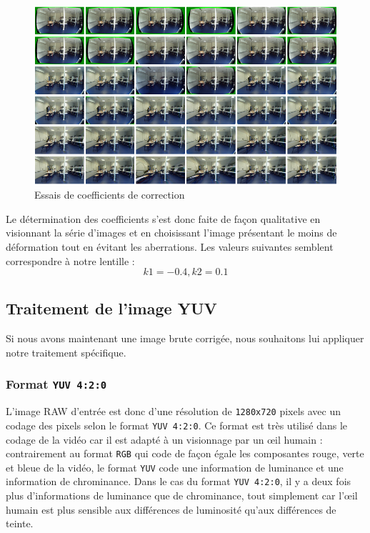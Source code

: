 \documentclass[11pt,a4paper]{article}
\begin{document}
\bigbreak
\bigbreak
\begin{figure}[H]
\begin{center}
\includegraphics[scale=0.3]{images/fisheye_tries.png}
\end{center}
\caption{Essais de coefficients de correction}
\label{}
\end{figure}
\bigbreak

\bigbreak
Le détermination des coefficients s'est donc faite de façon qualitative en visionnant la série d'images et en choisissant l'image présentant le moins de déformation tout en évitant les aberrations.
Les valeurs suivantes semblent correspondre à notre lentille :
$$k1 = -0.4, k2 = 0.1$$

\subsection{Traitement de l'image YUV}
Si nous avons maintenant une image brute corrigée, nous souhaitons lui appliquer notre traitement spécifique.

\subsubsection{Format \texttt{YUV 4:2:0}}
L'image RAW d'entrée est donc d'une résolution de \texttt{1280x720} pixels avec un codage des pixels selon le format \texttt{YUV 4:2:0}.
Ce format est très utilisé dans le codage de la vidéo car il est adapté à un visionnage par un œil humain : contrairement au format \texttt{RGB} qui code de façon égale les composantes rouge, verte et bleue de la vidéo, le format \texttt{YUV} code une information de luminance et une information de chrominance.
Dans le cas du format \texttt{YUV 4:2:0}, il y a deux fois plus d'informations de luminance que de chrominance, tout simplement car l'œil humain est plus sensible aux différences de luminosité qu'aux différences de teinte.
\end{document}
